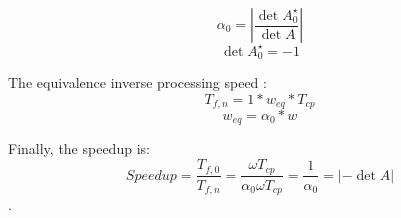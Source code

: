 $$\alpha_{0} = \left |\frac{\det A^{\star}_{0}}{\det A} \right |$$
$$\det A^{\star}_{0} = -1$$

The equivalence inverse processing speed :
$$T_{f,n} = 1*w_{eq}*T_{cp}$$
$$w_{eq} = \alpha_{0}*w$$

Finally, the speedup is:
$$Speedup = \frac{T_{f, 0}}{T_{f, n}}= \frac{\omega T_{cp}}{\alpha_{0}\omega T_{cp}} = \frac{1}{\alpha_{0}} =  \left|-\det A\right|$$.
